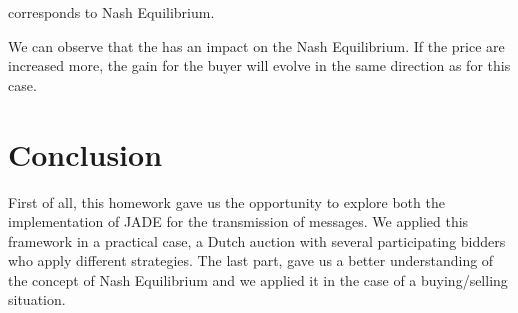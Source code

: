 \documentclass[a4paper,11pt]{article}
\begin{document}
  \color{red}{Red values}\color{black}{} corresponds to Nash Equilibrium.
  
  We can observe that the \cu{} has an impact on the Nash Equilibrium. If the price are increased more, the gain for the buyer
  will evolve in the same direction as for this case.

  \section{Conclusion}
  
  First of all, this homework gave us the opportunity to explore both the implementation of JADE for the transmission of messages.
  We applied this framework in a practical case, a Dutch auction with several participating bidders who apply different
  strategies. The last part, gave us a better understanding of the concept of Nash Equilibrium and we applied it in the case
  of a buying/selling situation.
\end{document}
